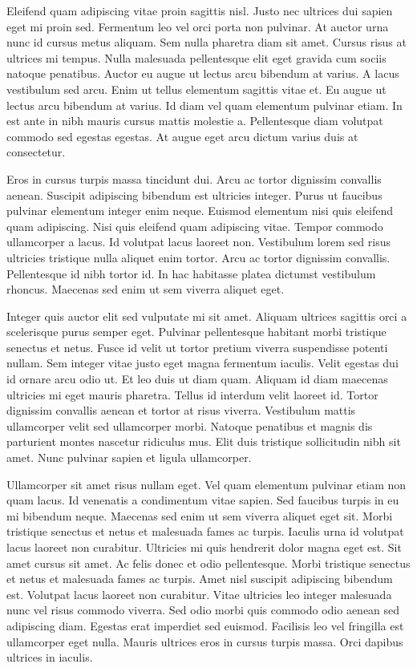 \documentclass[11pt,a4paper]{article}
\begin{document}
Eleifend quam adipiscing vitae proin sagittis nisl. Justo nec ultrices dui sapien eget mi proin sed. Fermentum leo vel orci porta non pulvinar. At auctor urna nunc id cursus metus aliquam. Sem nulla pharetra diam sit amet. Cursus risus at ultrices mi tempus. Nulla malesuada pellentesque elit eget gravida cum sociis natoque penatibus. Auctor eu augue ut lectus arcu bibendum at varius. A lacus vestibulum sed arcu. Enim ut tellus elementum sagittis vitae et. Eu augue ut lectus arcu bibendum at varius. Id diam vel quam elementum pulvinar etiam. In est ante in nibh mauris cursus mattis molestie a. Pellentesque diam volutpat commodo sed egestas egestas. At augue eget arcu dictum varius duis at consectetur.

Eros in cursus turpis massa tincidunt dui. Arcu ac tortor dignissim convallis aenean. Suscipit adipiscing bibendum est ultricies integer. Purus ut faucibus pulvinar elementum integer enim neque. Euismod elementum nisi quis eleifend quam adipiscing. Nisi quis eleifend quam adipiscing vitae. Tempor commodo ullamcorper a lacus. Id volutpat lacus laoreet non. Vestibulum lorem sed risus ultricies tristique nulla aliquet enim tortor. Arcu ac tortor dignissim convallis. Pellentesque id nibh tortor id. In hac habitasse platea dictumst vestibulum rhoncus. Maecenas sed enim ut sem viverra aliquet eget.

Integer quis auctor elit sed vulputate mi sit amet. Aliquam ultrices sagittis orci a scelerisque purus semper eget. Pulvinar pellentesque habitant morbi tristique senectus et netus. Fusce id velit ut tortor pretium viverra suspendisse potenti nullam. Sem integer vitae justo eget magna fermentum iaculis. Velit egestas dui id ornare arcu odio ut. Et leo duis ut diam quam. Aliquam id diam maecenas ultricies mi eget mauris pharetra. Tellus id interdum velit laoreet id. Tortor dignissim convallis aenean et tortor at risus viverra. Vestibulum mattis ullamcorper velit sed ullamcorper morbi. Natoque penatibus et magnis dis parturient montes nascetur ridiculus mus. Elit duis tristique sollicitudin nibh sit amet. Nunc pulvinar sapien et ligula ullamcorper.

Ullamcorper sit amet risus nullam eget. Vel quam elementum pulvinar etiam non quam lacus. Id venenatis a condimentum vitae sapien. Sed faucibus turpis in eu mi bibendum neque. Maecenas sed enim ut sem viverra aliquet eget sit. Morbi tristique senectus et netus et malesuada fames ac turpis. Iaculis urna id volutpat lacus laoreet non curabitur. Ultricies mi quis hendrerit dolor magna eget est. Sit amet cursus sit amet. Ac felis donec et odio pellentesque. Morbi tristique senectus et netus et malesuada fames ac turpis. Amet nisl suscipit adipiscing bibendum est. Volutpat lacus laoreet non curabitur. Vitae ultricies leo integer malesuada nunc vel risus commodo viverra. Sed odio morbi quis commodo odio aenean sed adipiscing diam. Egestas erat imperdiet sed euismod. Facilisis leo vel fringilla est ullamcorper eget nulla. Mauris ultrices eros in cursus turpis massa. Orci dapibus ultrices in iaculis.
\end{document}
